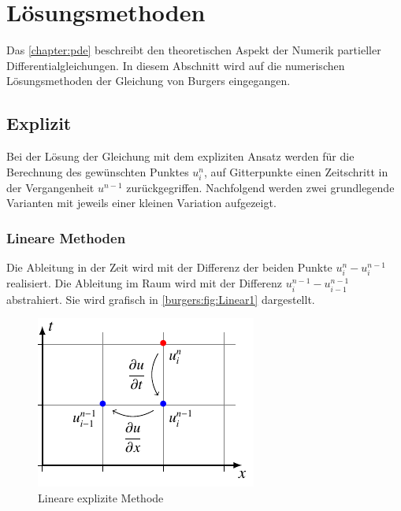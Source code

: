 %
%
\section{Lösungsmethoden
\label{burgers:section:loesung}}

Das \autoref{chapter:pde} beschreibt den theoretischen Aspekt der Numerik  partieller Differentialgleichungen.
In diesem Abschnitt wird auf die numerischen Lösungsmethoden der Gleichung von Burgers eingegangen.


\subsection{Explizit}

Bei der Lösung der Gleichung mit dem expliziten Ansatz werden für die Berechnung des gewünschten Punktes $u_i^n$, auf Gitterpunkte einen Zeitschritt in der Vergangenheit $u^{n-1}$ zurückgegriffen.
Nachfolgend werden zwei grundlegende Varianten mit jeweils einer kleinen Variation aufgezeigt.

\subsubsection{Lineare Methoden}

	Die Ableitung in der Zeit wird mit der Differenz der beiden Punkte $u_{i}^{n}-u_{i}^{n-1}$ realisiert.
	Die Ableitung im Raum wird mit der Differenz $u_{i}^{n-1}-u_{i-1}^{n-1}$ abstrahiert.
	Sie wird grafisch in \autoref{burgers:fig:Linear1} dargestellt.


	     \begin{figure}
		\centering
		\includegraphics[height=.4\textwidth]{papers/burgers/BurgersEquation/tikz/linear1/linear1.pdf}
		\caption{Lineare explizite Methode}
		\label{burgers:fig:Linear1}
		\end{figure}

